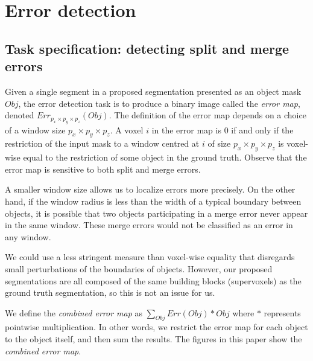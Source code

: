\documentclass{article}
\begin{document}
\section{Error detection}
\subsection{Task specification: detecting split and merge errors}
\label{sec:detection_spec}
Given a single segment in a proposed segmentation presented as an object mask $Obj$, the error detection task is to produce a binary image called the \textit{error map}, denoted $Err_{p_x\times p_y \times p_z}(Obj)$. The definition of the error map depends on a choice of a window size $p_x \times p_y \times p_z$. A voxel $i$ in the error map is 0 if and only if the restriction of the input mask to a window centred at $i$ of size $p_x \times p_y \times p_z$ is voxel-wise equal to the restriction of some object in the ground truth. Observe that the error map is sensitive to both split and merge errors.

A smaller window size allows us to localize errors more precisely. On the other hand, if the window radius is less than the width of a typical boundary between objects, it is possible that two objects participating in a merge error never appear in the same window. These merge errors would not be classified as an error in any window.

We could use a less stringent measure than voxel-wise equality that disregards small perturbations of the boundaries of objects. However, our proposed segmentations are all composed of the same building blocks (supervoxels) as the ground truth segmentation, so this is not an issue for us.

We define the \textit{combined error map} as $\sum_{Obj} Err(Obj) * Obj$ where $*$ represents pointwise multiplication. In other words, we restrict the error map for each object to the object itself, and then sum the results. The figures in this paper show the \textit{combined error map}.
\end{document}
